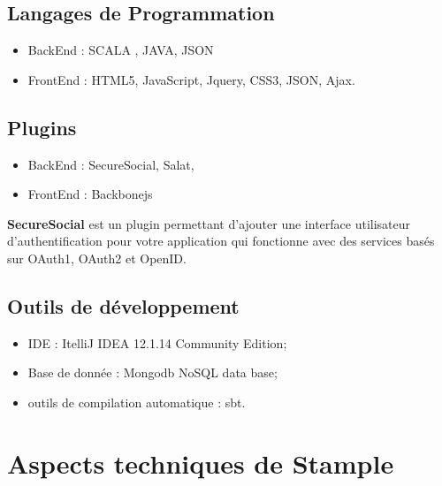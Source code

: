 \subsection{Langages de Programmation}
\begin{itemize}
\item BackEnd : SCALA , JAVA, JSON
\item FrontEnd : HTML5, JavaScript, Jquery, CSS3, JSON, Ajax. 
\end{itemize}
\subsection{Plugins}
\begin{itemize}
\item BackEnd : SecureSocial, Salat, 
\item FrontEnd : Backbonejs 
\end{itemize}
\textbf{SecureSocial} est un plugin permettant d'ajouter une interface utilisateur d'authentification pour votre application qui fonctionne avec des services basés sur OAuth1, OAuth2 et OpenID.
\subsection{Outils de développement}
\begin{itemize}
\item IDE : ItelliJ IDEA 12.1.14 Community Edition;
\item Base de donnée : Mongodb NoSQL data base;
\item outils de compilation automatique : sbt.
\end{itemize}
\section{Aspects techniques de Stample}
